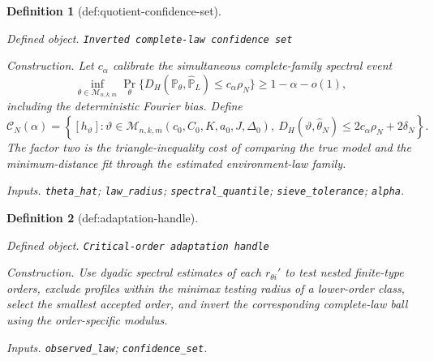 \documentclass{article}
\newtheorem{definition}{Definition}
\begin{document}
\begin{definition}[def:quotient-confidence-set]\label{def:quotient-confidence-set}
\par\smallskip\noindent\emph{Defined object.} \texttt{Inverted complete-\allowbreak{}law confidence set}
\par\smallskip\noindent\emph{Construction.} Let \(c_\alpha\) calibrate the simultaneous complete-family spectral event
\[
\inf_{\theta\in\mathcal M_{n,k,m}}
\Pr_\theta\{D_H(\mathbb P_\theta,\widehat{\mathbb P}_L)\le c_\alpha\rho_N\}
\ge1-\alpha-o(1),
\]
including the deterministic Fourier bias. Define
\[
\mathcal C_N(\alpha)=\left\{[h_\vartheta]:
\vartheta\in\mathcal M_{n,k,m}(c_0,C_0,K,a_0,J,\Delta_0),\ 
D_H(\vartheta,\widehat\theta_N)\le2c_\alpha\rho_N+2\delta_N\right\}.
\]
The factor two is the triangle-inequality cost of comparing the true model and the minimum-distance fit through the estimated environment-law family.
\par\smallskip\noindent\emph{Inputs.} \texttt{theta\_\allowbreak{}hat}; \texttt{law\_\allowbreak{}radius}; \texttt{spectral\_\allowbreak{}quantile}; \texttt{sieve\_\allowbreak{}tolerance}; \texttt{alpha}.
\end{definition}

\begin{definition}[def:adaptation-handle]\label{def:adaptation-handle}
\par\smallskip\noindent\emph{Defined object.} \texttt{Critical-\allowbreak{}order adaptation handle}
\par\smallskip\noindent\emph{Construction.} Use dyadic spectral estimates of each \(r_{\theta i}'\) to test nested finite-type orders, exclude profiles within the minimax testing radius of a lower-order class, select the smallest accepted order, and invert the corresponding complete-law ball using the order-specific modulus.
\par\smallskip\noindent\emph{Inputs.} \texttt{observed\_\allowbreak{}law}; \texttt{confidence\_\allowbreak{}set}.
\end{definition}
\end{document}
